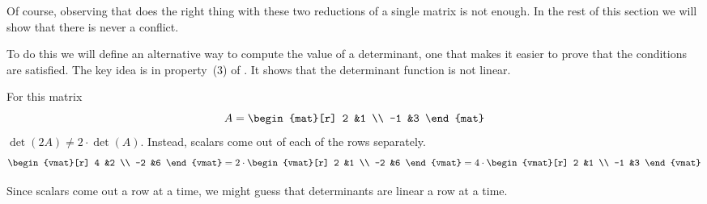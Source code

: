 Of course, observing that  does the right thing
with these two reductions of a single matrix is not enough.
In the rest of this 
section we will show that there is never a conflict.


To do this we will define an alternative way to compute
the value of a determinant, one that makes it easier to 
prove that the conditions are satisfied.
The key idea is in   
property~(3) of .
It shows that the determinant function is not linear.

\begin{example}
For this matrix
\begin{equation*}
   A=\begin{mat}[r]
       2  &1  \\
      -1  &3
     \end{mat}
\end{equation*} 
\( \det(2A)\neq 2\cdot\det(A) \).
Instead, scalars come out of each of the rows separately.
\begin{equation*}
   \begin{vmat}[r]
       4  &2  \\
      -2  &6
     \end{vmat}
  =2\cdot\begin{vmat}[r]
       2  &1  \\
      -2  &6
     \end{vmat}
  =4\cdot\begin{vmat}[r]
       2  &1  \\
      -1  &3
     \end{vmat}
\end{equation*}
\end{example}

Since scalars come out a row at a time, we might guess that
determinants are linear a row at a time.

